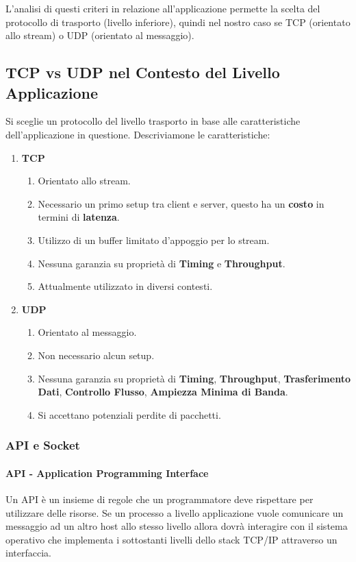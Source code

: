 \documentclass{article}
\begin{document}
L'analisi di questi criteri in relazione all'applicazione permette la scelta del protocollo di trasporto (livello inferiore), quindi nel nostro caso se TCP (orientato allo stream) o UDP (orientato al messaggio).

\newpage

\subsection{TCP vs UDP nel Contesto del Livello Applicazione}

Si sceglie un protocollo del livello trasporto in base alle caratteristiche dell'applicazione in questione. Descriviamone le caratteristiche:

\begin{enumerate}
    \item \textbf{TCP}
    \begin{enumerate}
        \item Orientato allo stream.
        \item Necessario un primo setup tra client e server, questo ha un \textbf{costo} in termini di \textbf{latenza}.
        \item Utilizzo di un buffer limitato d'appoggio per lo stream.
        \item Nessuna garanzia su proprietà di \textbf{Timing} e \textbf{Throughput}.
        \item Attualmente utilizzato in diversi contesti.
    \end{enumerate}
    \item \textbf{UDP}
    \begin{enumerate}
        \item Orientato al messaggio.
        \item Non necessario alcun setup.
        \item Nessuna garanzia su proprietà di \textbf{Timing}, \textbf{Throughput}, \textbf{Trasferimento Dati}, \textbf{Controllo Flusso}, \textbf{Ampiezza Minima di Banda}.
        \item Si accettano potenziali perdite di pacchetti.
    \end{enumerate}
\end{enumerate}

\subsubsection{API e Socket}

\paragraph{API - Application Programming Interface} Un API è un insieme di regole che un programmatore deve rispettare per utilizzare delle risorse. Se un processo
a livello applicazione vuole comunicare un messaggio ad un altro host allo stesso livello allora dovrà interagire con il sistema operativo che implementa i sottostanti
livelli dello stack TCP/IP attraverso un interfaccia.
\end{document}
